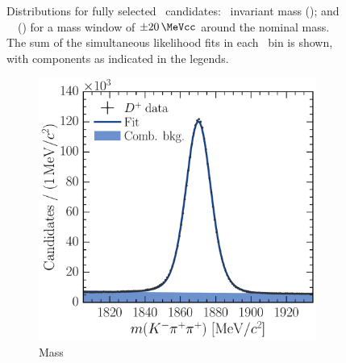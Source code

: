 \begin{figure}
\begin{subfigure}[b]{0.5\textwidth}
    \caption{\lnipchisq}
    \label{fig:prod:fitting:D0ToKpi:ipchisq}
  \end{subfigure}
  \caption{%
    Distributions for fully selected \DzToKpi\ candidates: \PDzero\ invariant 
    mass (); and \PDzero\ \lnipchisq\ 
    () for a mass window of 
    $\pm\SI{20}{\MeVcc}$ around the nominal \PDzero mass.
    The sum of the simultaneous likelihood fits in each \pTy\ bin is shown, 
    with components as indicated in the legends.
  }
  \label{fig:prod:fitting:D0ToKpi}
\end{figure}

\begin{figure}
  \begin{subfigure}[b]{0.5\textwidth}
    \centering
    \includegraphics[width=\textwidth]{figures/production/fitting/DpToKpipi_mass_fit_pT_integrated_y_integrated}
    \caption{Mass}
    \label{fig:prod:fitting:DpToKpipi:mass}
  \end{subfigure}
  \begin{subfigure}[b]{0.5\textwidth}
    \centering

\end{subfigure}
\end{figure}
